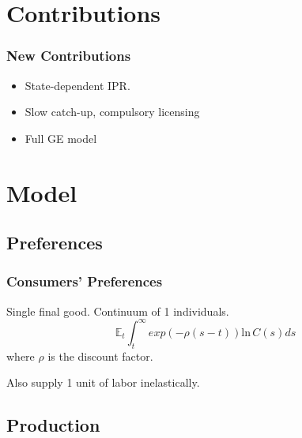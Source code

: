 \documentclass{beamer}
\begin{document}
\section{Contributions}
\label{sec:contributions}

\begin{frame}[t]\frametitle{New Contributions} 
  \begin{itemize}
    \item State-dependent IPR.
    \item Slow catch-up, compulsory licensing %
    \item Full GE model %
  \end{itemize}
\end{frame}

\section{Model}
\label{sec:model}

\subsection{Preferences}
\label{sub:preferences}

\begin{frame}[t]\frametitle{Consumers' Preferences} 
  Single final good.  Continuum of 1 individuals.
  \begin{equation*} \label{eq:pref}
    \mathbb{E}_t \int_t^\infty exp(-\rho(s - t))\mathrm{ln}\,   C(s)ds
  \end{equation*}
  where $\rho$ is the discount factor.
  
  Also supply 1 unit of labor inelastically. 
\end{frame}

\subsection{Production}
\label{sub:production}
\end{document}

